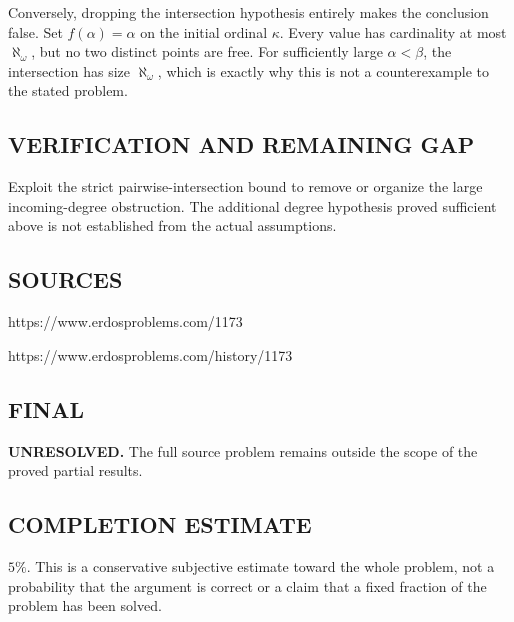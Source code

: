 Conversely, dropping the intersection hypothesis entirely makes the conclusion
false. Set $f(\alpha)=\alpha$ on the initial ordinal $\kappa$. Every value has
cardinality at most $\aleph_\omega$, but no two distinct points are free.
For sufficiently large $\alpha<\beta$, the intersection has size $\aleph_\omega$,
which is exactly why this is not a counterexample to the stated problem.

\subsection*{VERIFICATION AND REMAINING GAP}
Exploit the strict pairwise-intersection bound to remove or organize the
large incoming-degree obstruction. The additional degree hypothesis proved
sufficient above is not established from the actual assumptions.

\subsection*{SOURCES}
https://www.erdosproblems.com/1173

https://www.erdosproblems.com/history/1173

\subsection*{FINAL}
\textbf{UNRESOLVED.} The full source problem remains outside the scope of the proved partial results.

\subsection*{COMPLETION ESTIMATE}
$5\%$. This is a conservative subjective estimate toward the whole problem, not a probability that the argument is correct or a claim that a fixed fraction of the problem has been solved.
